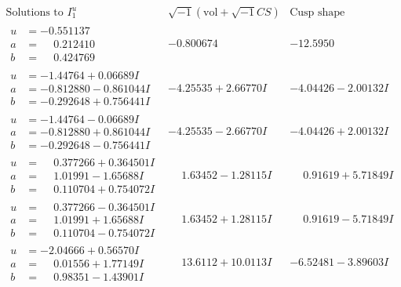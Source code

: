 \documentclass[1p]{elsarticle_modified}
\theoremstyle{definition}
\newcommand{\I}{\sqrt{-1}}
\begin{document}
$$\begin{array}{c|c|c}  
\text{Solutions to }I^u_{1}& \I (\text{vol} + \sqrt{-1}CS) & \text{Cusp shape}\\
 \hline 
\begin{aligned}
u &= -0.551137\phantom{ +0.000000I} \\
a &= \phantom{-}0.212410\phantom{ +0.000000I} \\
b &= \phantom{-}0.424769\phantom{ +0.000000I}\end{aligned}
 & -0.800674\phantom{ +0.000000I} & -12.5950\phantom{ +0.000000I} \\ \hline\begin{aligned}
u &= -1.44764 + 0.06689 I \\
a &= -0.812880 - 0.861044 I \\
b &= -0.292648 + 0.756441 I\end{aligned}
 & -4.25535 + 2.66770 I & -4.04426 - 2.00132 I \\ \hline\begin{aligned}
u &= -1.44764 - 0.06689 I \\
a &= -0.812880 + 0.861044 I \\
b &= -0.292648 - 0.756441 I\end{aligned}
 & -4.25535 - 2.66770 I & -4.04426 + 2.00132 I \\ \hline\begin{aligned}
u &= \phantom{-}0.377266 + 0.364501 I \\
a &= \phantom{-}1.01991 - 1.65688 I \\
b &= \phantom{-}0.110704 + 0.754072 I\end{aligned}
 & \phantom{-}1.63452 - 1.28115 I & \phantom{-}0.91619 + 5.71849 I \\ \hline\begin{aligned}
u &= \phantom{-}0.377266 - 0.364501 I \\
a &= \phantom{-}1.01991 + 1.65688 I \\
b &= \phantom{-}0.110704 - 0.754072 I\end{aligned}
 & \phantom{-}1.63452 + 1.28115 I & \phantom{-}0.91619 - 5.71849 I \\ \hline\begin{aligned}
u &= -2.04666 + 0.56570 I \\
a &= \phantom{-}0.01556 + 1.77149 I \\
b &= \phantom{-}0.98351 - 1.43901 I\end{aligned}
 & \phantom{-}13.6112 + 10.0113 I & -6.52481 - 3.89603 I \\ \hline\begin{aligned}

\end{aligned}
\end{array}$$
\end{document}
